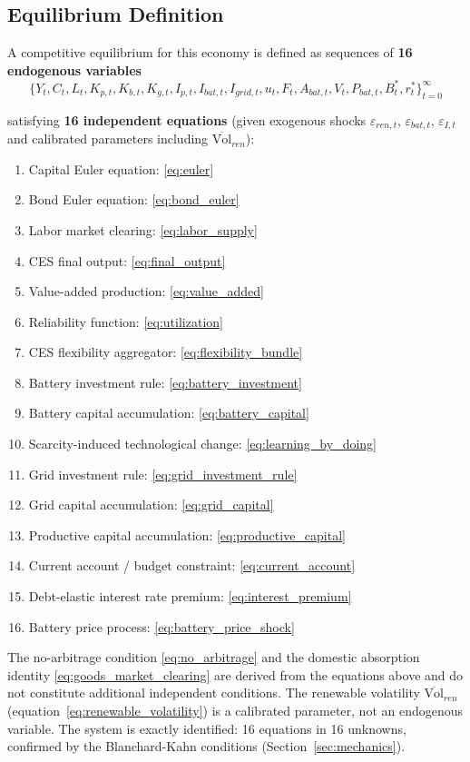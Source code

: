 \documentclass[12pt, a4paper]{article}
\begin{document}
\subsection{Equilibrium Definition}

A competitive equilibrium for this economy is defined as sequences of \textbf{16 endogenous variables}
$$\{Y_t, C_t, L_t, K_{p,t}, K_{b,t}, K_{g,t}, I_{p,t}, I_{bat,t}, I_{grid,t}, u_t, F_t, A_{bat,t}, V_t, P_{bat,t}, B^*_t, r^*_t\}_{t=0}^{\infty}$$

satisfying \textbf{16 independent equations} (given exogenous shocks $\varepsilon_{ren,t}$, $\varepsilon_{bat,t}$, $\varepsilon_{I,t}$ and calibrated parameters including $\overline{\text{Vol}}_{ren}$):

\begin{enumerate}
    \item Capital Euler equation: \eqref{eq:euler}
    \item Bond Euler equation: \eqref{eq:bond_euler}
    \item Labor market clearing: \eqref{eq:labor_supply}
    \item CES final output: \eqref{eq:final_output}
    \item Value-added production: \eqref{eq:value_added}
    \item Reliability function: \eqref{eq:utilization}
    \item CES flexibility aggregator: \eqref{eq:flexibility_bundle}
    \item Battery investment rule: \eqref{eq:battery_investment}
    \item Battery capital accumulation: \eqref{eq:battery_capital}
    \item Scarcity-induced technological change: \eqref{eq:learning_by_doing}
    \item Grid investment rule: \eqref{eq:grid_investment_rule}
    \item Grid capital accumulation: \eqref{eq:grid_capital}
    \item Productive capital accumulation: \eqref{eq:productive_capital}
    \item Current account / budget constraint: \eqref{eq:current_account}
    \item Debt-elastic interest rate premium: \eqref{eq:interest_premium}
    \item Battery price process: \eqref{eq:battery_price_shock}
\end{enumerate}

\noindent The no-arbitrage condition \eqref{eq:no_arbitrage} and the domestic absorption identity \eqref{eq:goods_market_clearing} are derived from the equations above and do not constitute additional independent conditions. The renewable volatility $\overline{\text{Vol}}_{ren}$ (equation~\ref{eq:renewable_volatility}) is a calibrated parameter, not an endogenous variable. The system is exactly identified: 16 equations in 16 unknowns, confirmed by the Blanchard-Kahn conditions (Section~\ref{sec:mechanics}).
\end{document}
